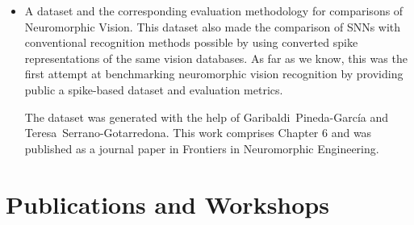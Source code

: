 \begin{itemize}
	\item 
	A dataset and the corresponding evaluation methodology for comparisons of Neuromorphic Vision.
	This dataset also made the comparison of SNNs with conventional recognition methods possible by using converted spike representations of the same vision databases.
	As far as we know, this was the first attempt at benchmarking neuromorphic vision recognition by providing public a spike-based dataset and evaluation metrics.
	
	The dataset was generated with the help of Garibaldi~Pineda-Garc\'ia and Teresa~Serrano-Gotarredona.
	This work comprises Chapter 6 and was published as a journal paper in Frontiers in Neuromorphic Engineering.
\end{itemize}

   
\section{Publications and Workshops}
